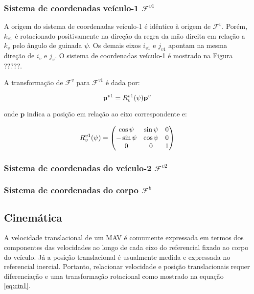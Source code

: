 \documentclass[a4paper, 12pt]{article}
\begin{document}
\subsubsection{Sistema de coordenadas veículo-1 $\mathcal{F}^{v1}$}

A origem do sistema de coordenadas veículo-1 é idêntico à origem de $\mathcal{F}^v$. Porém, $k_{v1}$ é rotacionado positivamente na direção da regra da mão direita em relação a $k_v$ pelo ângulo de guinada $\psi$. Os demais eixos $i_{v1}$ e $j_{v1}$ apontam na mesma direção de $i_v$ e $j_v$. O sistema de coordenadas veículo-1 é mostrado na Figura ?????. 

A transformação de $\mathcal{F}^{v}$ para $\mathcal{F}^{v1}$ é dada por:

\begin{equation}
\centering
\mathbf{p}^{v1} = { R }_{ v }^{ v1 }(\psi)\mathbf{p}^{v}
\label{eq:coord1}
\end{equation}

\noindent onde $\mathbf{p}$ indica a posição em relação ao eixo correspondente e: 

\begin{equation}
\centering
{ R }_{ v }^{ v1 }(\psi) = 
\begin{pmatrix} 
\cos { \psi  }  & \sin { \psi  } & 0 \\ -\sin { \psi  }  & \cos { \psi  } & 0  \\ 0  & 0 & 1 
\end{pmatrix}
\label{eq:coord1}
\end{equation}

\subsubsection{Sistema de coordenadas do veículo-2 $\mathcal{F}^{v2}$}

\subsubsection{Sistema de coordenadas do corpo $\mathcal{F}^{b}$}

\subsection{Cinemática}

A velocidade translacional de um MAV é comumente expressada em termos dos componentes das velocidades ao longo de cada eixo do referencial fixado ao corpo do veículo. Já a posição translacional é usualmente medida e expressada no referencial inercial. Portanto, relacionar velocidade e posição translacionais requer diferenciação e uma transformação rotacional como mostrado na equação \ref{eq:cin1}.
\end{document}
